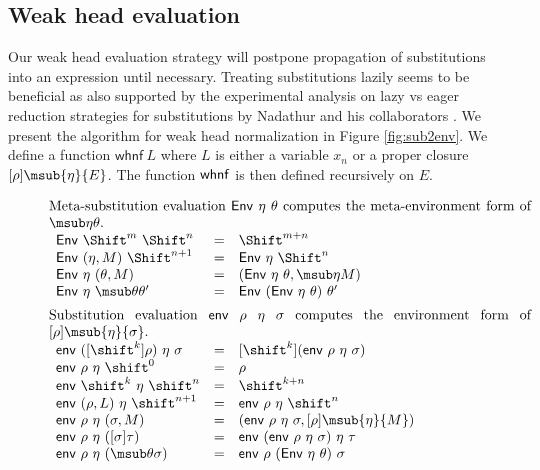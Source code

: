 \documentclass[copyright,creativecommons]{eptcs}
\makeatletter
\newcommand{\shiftby}[1]{\shift^{#1}}
\newcommand{\Shiftby}[1]{\Shift^{#1}}
\newcommand{\esub}[1]{[#1]}
\newcommand{\msubp}[2]{\msub{#1}(#2)}
\newcommand{\dsub}[3]{\esub{#1}{\msub{#2}{#3}}} \newcommand{\dsubp}[3]{\esub{#1}{\msubp{#2}{#3}}} \newcommand{\fun}[1]{\Pi\,#1.\,}
\newcommand{\aboxiii}[1]{\multicolumn 3 {@{}p{\textwidth}@{}} {#1}}
\newcommand{\twhnf}{\mathsf{whnf}}
\newcommand{\twsub}{\mathsf{env}}
\newcommand{\wsub}[3]{\twsub~#1~#2~#3}
\newcommand{\wsubp}[3]{\wsub{#1}{#2}{(#3)}}
\newcommand{\twmsub}{\mathsf{Env}}
\newcommand{\wmsub}[2]{\twmsub~#1~#2}
\newcommand{\shiftEnv}[1]{\esub{\shiftby{#1}}}
\newcommand{\shiftEnvp}[2]{\esub{\shiftby{#1}}{(#2)}}
\makeatother
\begin{document}
\subsection{Weak head evaluation}

Our weak head evaluation strategy will postpone
propagation of substitutions into an expression until necessary. 
Treating substitutions lazily seems to be beneficial as also
supported by the experimental analysis on lazy vs eager reduction
strategies for substitutions by Nadathur and his collaborators
\cite{liangNadathurQi:jar05}. We present the algorithm for weak head
normalization in Figure \ref{fig:sub2env}.
We define a function $\twhnf~L$ where $L$ is either a variable $x_n$ or
a proper closure $\dsub \rho \eta E$. The function $\twhnf\/$ is then
defined recursively on $E$.  

\begin{figure}
  \centering
\[
\begin{array}{lll}
\aboxiii{Meta-substitution evaluation $\wmsub \eta \theta$ computes the meta-environment form of $\msub \eta \theta$.} 
\\[0.5em]
  \wmsub {\Shiftby m}{\Shiftby n}    & = & \Shiftby{m+n} \\
  \wmsub {(\eta, M)}{\Shiftby {n+1}} & = & \wmsub \eta {\Shiftby n} \\
  \wmsub {\eta}{(\theta, M)}         & = & (\wmsub \eta \theta, \msub
    \eta M) \\
  \wmsub {\eta}{\msub \theta {\theta'}} & = & \wmsub {(\wmsub \eta
    \theta)} {\theta'}  
\\[0.5em]
\aboxiii{Substitution evaluation $\wsub \rho \eta \sigma$ computes the environment form of $\dsub \rho \eta \sigma$.} 
\\[0.5em]
  \wsub {(\shiftEnv k \rho)} \eta \sigma & = & 
    \shiftEnvp k {\wsub \rho \eta \sigma} \\
  \wsub \rho \eta {\shiftby 0} & = & \rho \\  
  \wsub {\shiftby k} \eta {\shiftby n}   & = & \shiftby {k + n}  \\
  \wsub {(\rho, L)} \eta {\shiftby{n+1}} & = & \wsub \rho \eta {\shiftby n} \\
  \wsubp \rho \eta {\sigma, M} & = & (\wsub \rho \eta \sigma,
    \dsub \rho \eta M) \\   
  \wsubp \rho \eta {\esub \sigma \tau} & = & \wsub {(\wsub \rho
    \eta \sigma)} \eta \tau \\  
  \wsubp \rho \eta {\msub \theta \sigma} & = & \wsub \rho {(\wmsub
    \eta \theta)} \sigma 

\end{array}\]
\end{figure}
\end{document}
